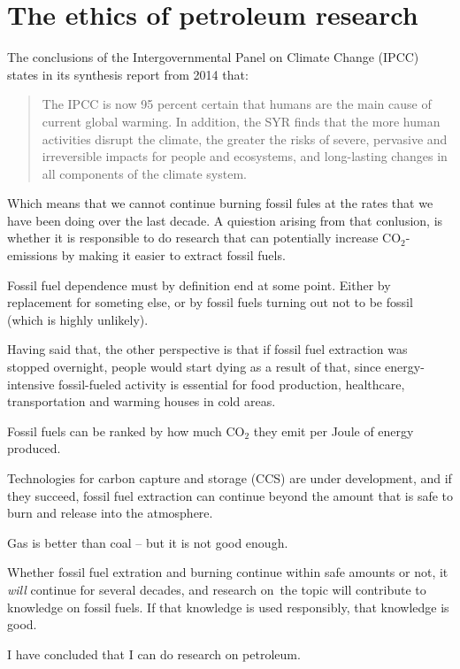 \section{The ethics of petroleum research}
The conclusions of the Intergovernmental Panel on Climate Change (IPCC) states in its synthesis report from 2014 \cite{IPCC2014} that:

\begin{quotation}
The IPCC is now 95 percent certain that humans are the main cause of current global warming. In addition, the SYR finds that the more human activities disrupt the climate, the greater the risks of severe, pervasive and irreversible impacts for people and ecosystems, and long-lasting changes in all components of the climate system. 
\end{quotation}

Which means that we cannot continue burning fossil fules at the rates that we have been doing over the last decade. A quiestion arising from that conlusion, is whether it is responsible to do research that can potentially increase CO$_2$-emissions by making it easier to extract fossil fuels.

Fossil fuel dependence must by definition end at some point. Either by replacement for someting else, or by fossil fuels turning out not to be fossil (which is highly unlikely). 

Having said that, the other perspective is that if fossil fuel extraction was stopped overnight, people would start dying as a result of that, since energy-intensive fossil-fueled activity is essential for food production, healthcare, transportation and warming houses in cold areas.

Fossil fuels can be ranked by how much CO$_2$ they emit per Joule of energy produced.

Technologies for carbon capture and storage (CCS) are under development, and if they succeed, fossil fuel extraction can continue beyond the amount that is safe to burn and release into the atmosphere. 

Gas is better than coal -- but it is not good enough.

Whether fossil fuel extration and burning continue within safe amounts or not, it \emph{will} continue for several decades, and research on the topic will contribute to knowledge on fossil fuels. If that knowledge is used responsibly, that knowledge is good.



I have concluded that I can do research on petroleum. 


